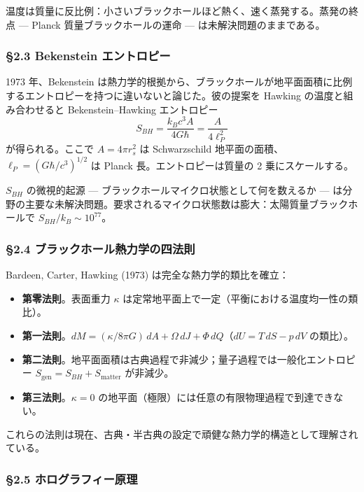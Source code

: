 \documentclass[a4paper,11pt]{ltjsarticle}
\theoremstyle{definition}
\providecommand{\tightlist}{\setlength{\itemsep}{0pt}\setlength{\parskip}{0pt}}
\begin{document}
温度は質量に反比例：小さいブラックホールほど熱く、速く蒸発する。蒸発の終点
--- Planck 質量ブラックホールの運命 --- は未解決問題のままである。

\subsubsection{§2.3 Bekenstein
エントロピー}\label{bekenstein-ux30a8ux30f3ux30c8ux30edux30d4ux30fc}

1973 年、Bekenstein
は熱力学的根拠から、ブラックホールが地平面面積に比例するエントロピーを持つに違いないと論じた。彼の提案を
Hawking の温度と組み合わせると Bekenstein--Hawking エントロピー
\[S_{BH} = \frac{k_B c^3 A}{4 G \hbar} = \frac{A}{4 \ell_P^2}\]
が得られる。ここで \(A = 4\pi r_s^2\) は Schwarzschild
地平面の面積、\(\ell_P = (G\hbar/c^3)^{1/2}\) は Planck
長。エントロピーは質量の 2 乗にスケールする。

\(S_{BH}\) の微視的起源 --- ブラックホールマイクロ状態として何を数えるか
---
は分野の主要な未解決問題。要求されるマイクロ状態数は膨大：太陽質量ブラックホールで
\(S_{BH}/k_B \sim 10^{77}\)。

\subsubsection{§2.4
ブラックホール熱力学の四法則}\label{ux30d6ux30e9ux30c3ux30afux30dbux30fcux30ebux71b1ux529bux5b66ux306eux56dbux6cd5ux5247}

Bardeen, Carter, Hawking (1973) は完全な熱力学的類比を確立：

\begin{itemize}
\tightlist
\item
  \textbf{第零法則}。表面重力 \(\kappa\)
  は定常地平面上で一定（平衡における温度均一性の類比）。
\item
  \textbf{第一法則}。\(dM = (\kappa / 8\pi G)\, dA + \Omega\, dJ + \Phi\, dQ\)（\(dU = T\, dS - p\, dV\)
  の類比）。
\item
  \textbf{第二法則}。地平面面積は古典過程で非減少；量子過程では一般化エントロピー
  \(S_{\mathrm{gen}} = S_{BH} + S_{\mathrm{matter}}\) が非減少。
\item
  \textbf{第三法則}。\(\kappa = 0\)
  の地平面（極限）には任意の有限物理過程で到達できない。
\end{itemize}

これらの法則は現在、古典・半古典の設定で頑健な熱力学的構造として理解されている。

\subsubsection{§2.5
ホログラフィー原理}\label{ux30dbux30edux30b0ux30e9ux30d5ux30a3ux30fcux539fux7406}
\end{document}
